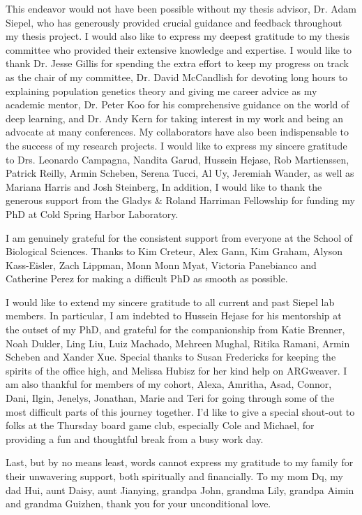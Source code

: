 
This endeavor would not have been possible without my thesis advisor, Dr. Adam Siepel, who has generously provided crucial guidance and feedback throughout my thesis project. I would also like to express my deepest gratitude to my thesis committee who provided their extensive knowledge and expertise. I would like to thank Dr. Jesse Gillis for spending the extra effort to keep my progress on track as the chair of my committee, Dr. David McCandlish for devoting long hours to explaining population genetics theory and giving me career advice as my academic mentor, Dr. Peter Koo for his comprehensive guidance on the world of deep learning, and Dr. Andy Kern for taking interest in my work and being an advocate at many conferences. My collaborators have also been indispensable to the success of my research projects. I would like to express my sincere gratitude to Drs. Leonardo Campagna, Nandita Garud, Hussein Hejase, Rob Martienssen, Patrick Reilly, Armin Scheben, Serena Tucci, Al Uy, Jeremiah Wander, as well as Mariana Harris and Josh Steinberg, In addition, I would like to thank the generous support from the Gladys \& Roland Harriman Fellowship for funding my PhD at Cold Spring Harbor Laboratory.

I am genuinely grateful for the consistent support from everyone at the School of Biological Sciences. Thanks to Kim Creteur, Alex Gann, Kim Graham, Alyson Kass-Eisler, Zach Lippman, Monn Monn Myat, Victoria Panebianco and Catherine Perez for making a difficult PhD as smooth as possible.

I would like to extend my sincere gratitude to all current and past Siepel lab members. In particular, I am indebted to Hussein Hejase for his mentorship at the outset of my PhD, and grateful for the companionship from Katie Brenner, Noah Dukler, Ling Liu, Luiz Machado, Mehreen Mughal, Ritika Ramani, Armin Scheben and Xander Xue. Special thanks to Susan Fredericks for keeping the spirits of the office high, and Melissa Hubisz for her kind help on ARGweaver. I am also thankful for members of my cohort, Alexa, Amritha, Asad, Connor, Dani, Ilgin, Jenelys, Jonathan, Marie and Teri for going through some of the most difficult parts of this journey together. I'd like to give a special shout-out to folks at the Thursday board game club, especially Cole and Michael, for providing a fun and thoughtful break from a busy work day.

Last, but by no means least, words cannot express my gratitude to my family for their unwavering support, both spiritually and financially. To my mom Dq, my dad Hui, aunt Daisy, aunt Jianying, grandpa John, grandma Lily, grandpa Aimin and grandma Guizhen, thank you for your unconditional love.

